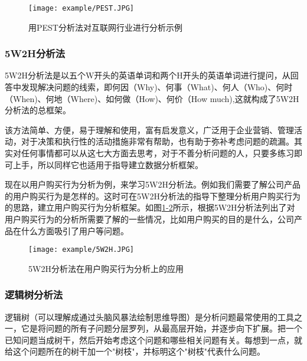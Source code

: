 \begin{figure}[!htp]

\centering
\texttt{[image: example/PEST.JPG]}
\caption{用PEST分析法对互联网行业进行分析示例}
\label{fig:1-1}

\end{figure}

\subsubsection{5W2H分析法}

5W2H分析法是以五个W开头的英语单词和两个H开头的英语单词进行提问，从回答中发现解决问题的线索，即何因（Why)、何事（What)、何人（Who)、何时（When)、何地（Where)、如何做（How)、何价（How much),这就构成了5W2H分析法的总框架。

该方法简单、方便，易于理解和使用，富有启发意义，广泛用于企业营销、管理活动，对于决策和执行性的活动措施非常有帮助，也有助于弥补考虑问题的疏漏。其实对任何事情都可以从这七大方面去思考，对于不善分析问题的人，只要多练习即可上手，所以同样它也适用于指导建立数据分析框架。

现在以用户购买行为分析为例，来学习5W2H分析法。例如我们需要了解公司产品的用户购买行为是怎样的。这时可在5W2H分析法的指导下整理分析用户购买行为的思路，建立用户购买行为分析框架。如图\href{fig:1-2}{1-2}所示，根据5W2H分析法列出了对用户购买行为的分析所需要了解的一些情况，比如用户购买的目的是什么，公司产品在什么方面吸引了用户等问题。

\begin{figure}[!htp]

\centering
\texttt{[image: example/5W2H.JPG]}
\caption{5W2H分析法在用户购买行为分析上的应用}
\label{fig:1-2}

\end{figure}

\subsubsection{逻辑树分析法}

逻辑树（可以理解成通过头脑风暴法绘制思维导图）是分析问题最常使用的工具之一，它是将问题的所有子问题分层罗列，从最高层开始，并逐步向下扩展。把一个已知问题当成树干，然后开始考虑这个问题和哪些相关问题有关。每想到一点，就给这个问题所在的树干加一个"树枝"，并标明这个"树枝"代表什么问题。

